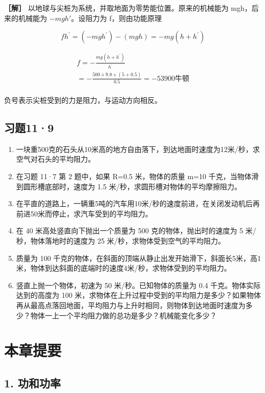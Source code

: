 \textbf{［解］} 以地球与尖桩为系统，并取地面为零势能位置。原来的机械能为
mgh，后来的机械能为 \(-mgh'\)。设阻力为 f，则由功能原理

\[
f h ^ {\prime} = (- m g h ^ {\prime}) - (m g h) = - m g (h + h ^ {\prime})
\]

\[
\begin{array}{l} f = - \frac {m g (h + h ^ {\prime})}{h ^ {\prime}} \\ = - \frac {500 \times 9.8 \times (5 + 0.5)}{0.5} = - 53900 \text{牛顿} \\ \end{array}
\]

负号表示尖桩受到的力是阻力，与运动方向相反。

\subsection{习题11·9}\label{ux4e60ux9898119}

\begin{enumerate}
\def\labelenumi{\arabic{enumi}.}
\item
  一块重500克的石头从10米高的地方自由落下，到达地面时速度为12米/秒，求空气对石头的平均阻力。
\item
  在习题 11·7 第 2 题中，如果 R=0.5 米，物体的质量 m=10
  千克，当物体滑到圆形槽底部时，速度为 1.5
  米/秒，求圆形槽对物体的平均摩擦阻力。
\item
  在平直的道路上，一辆重5吨的汽车用10米/秒的速度前进，在关闭发动机后再前进50米而停止，求汽车受到的平均阻力。
\item
  在 40 米高处竖直向下抛出一个质量为 500 克的物体，抛出时的速度为 5
  米/秒，物体落地时的速度为 25 米/秒，求物体受到空气的平均阻力。
\item
  质量为 100
  千克的物体，在斜面的顶端从静止出发开始滑下，斜面长5米，高1米，物体到达斜面的底端时的速度4米/秒，求物体受到的平均阻力。
\item
  竖直上抛一个物体，初速为 50 米/秒。已知物体的质量为 0.4
  千克。物体实际达到的高度为 100
  米，求物体在上升过程中受到的平均阻力是多少？如果物体再从最高点落回地面，平均阻力与上升时相同，则物体到达地面时速度为多少？物体一上一个平均阻力做的总功是多少？机械能变化多少？
\end{enumerate}

\section{本章提要}\label{ux672cux7ae0ux63d0ux8981-10}

\subsection{1. 功和功率}\label{ux529fux548cux529fux7387}

